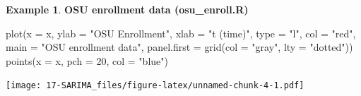 \documentclass[
]{book}
\newenvironment{Shaded}{\begin{snugshade}}{\end{snugshade}}
\newcommand{\AttributeTok}[1]{\textcolor[rgb]{0.77,0.63,0.00}{#1}}
\newcommand{\CommentTok}[1]{\textcolor[rgb]{0.56,0.35,0.01}{\textit{#1}}}
\newcommand{\ConstantTok}[1]{\textcolor[rgb]{0.00,0.00,0.00}{#1}}
\newcommand{\DecValTok}[1]{\textcolor[rgb]{0.00,0.00,0.81}{#1}}
\newcommand{\FunctionTok}[1]{\textcolor[rgb]{0.00,0.00,0.00}{#1}}
\newcommand{\NormalTok}[1]{#1}
\newcommand{\OtherTok}[1]{\textcolor[rgb]{0.56,0.35,0.01}{#1}}
\newcommand{\SpecialCharTok}[1]{\textcolor[rgb]{0.00,0.00,0.00}{#1}}
\newcommand{\StringTok}[1]{\textcolor[rgb]{0.31,0.60,0.02}{#1}}
\theoremstyle{definition}
\theoremstyle{definition}
\newtheorem{example}{Example}[chapter]
\theoremstyle{definition}
\theoremstyle{definition}
\theoremstyle{remark}
\begin{document}
\begin{example}
\textbf{OSU enrollment data (osu\_enroll.R)}

\begin{Shaded}
\end{Shaded}

\begin{Shaded}
\begin{Highlighting}[]
\FunctionTok{plot}\NormalTok{(}\AttributeTok{x =}\NormalTok{ x, }\AttributeTok{ylab =} \StringTok{"OSU Enrollment"}\NormalTok{, }\AttributeTok{xlab =} \StringTok{"t (time)"}\NormalTok{, }\AttributeTok{type =} \StringTok{"l"}\NormalTok{, }\AttributeTok{col =} \StringTok{"red"}\NormalTok{,}
    \AttributeTok{main =} \StringTok{"OSU enrollment data"}\NormalTok{, }\AttributeTok{panel.first =} \FunctionTok{grid}\NormalTok{(}\AttributeTok{col =} \StringTok{"gray"}\NormalTok{, }\AttributeTok{lty =} \StringTok{"dotted"}\NormalTok{))}
  \FunctionTok{points}\NormalTok{(}\AttributeTok{x =}\NormalTok{ x, }\AttributeTok{pch =} \DecValTok{20}\NormalTok{, }\AttributeTok{col =} \StringTok{"blue"}\NormalTok{)}
\end{Highlighting}
\end{Shaded}

\texttt{[image: 17-SARIMA\_files/figure-latex/unnamed-chunk-4-1.pdf]}

\begin{Shaded}
\end{Shaded}
\end{example}
\end{document}
